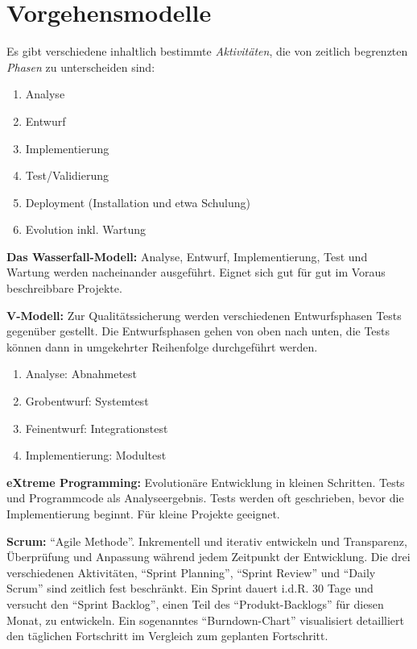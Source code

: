 \documentclass[german]{panikzettel}
\begin{document}
\section{Vorgehensmodelle}
\label{sec:vorgehensmodelle}

Es gibt verschiedene inhaltlich bestimmte \emph{Aktivitäten}, die von zeitlich begrenzten \emph{Phasen} zu unterscheiden sind:

\begin{enumerate}
  \item Analyse
  \item Entwurf
  \item Implementierung
  \item Test/Validierung
  \item Deployment (Installation und etwa Schulung)
  \item Evolution inkl. Wartung
\end{enumerate}

\textbf{Das Wasserfall-Modell:} Analyse, Entwurf, Implementierung, Test und Wartung werden nacheinander ausgeführt.
Eignet sich gut für gut im Voraus beschreibbare Projekte.

\textbf{V-Modell:} Zur Qualitätssicherung werden verschiedenen Entwurfsphasen Tests gegenüber gestellt.
Die Entwurfsphasen gehen von oben nach unten, die Tests können dann in umgekehrter Reihenfolge durchgeführt werden.
\begin{enumerate}
  \item Analyse: Abnahmetest
  \item Grobentwurf: Systemtest
  \item Feinentwurf: Integrationstest
  \item Implementierung: Modultest
\end{enumerate}

\textbf{eXtreme Programming:} Evolutionäre Entwicklung in kleinen Schritten.
Tests und Programmcode als Analyseergebnis.
Tests werden oft geschrieben, bevor die Implementierung beginnt.
Für kleine Projekte geeignet.

\textbf{Scrum:} ``Agile Methode''. Inkrementell und iterativ entwickeln und Transparenz, Überprüfung und Anpassung während jedem Zeitpunkt der Entwicklung.
Die drei verschiedenen Aktivitäten, ``Sprint Planning'', ``Sprint Review'' und ``Daily Scrum'' sind zeitlich fest beschränkt.
Ein Sprint dauert i.d.R. 30 Tage und versucht den ``Sprint Backlog'', einen Teil des ``Produkt-Backlogs'' für diesen Monat, zu entwickeln.
Ein sogenanntes ``Burndown-Chart'' visualisiert detailliert den täglichen Fortschritt im Vergleich zum geplanten Fortschritt.
\end{document}
